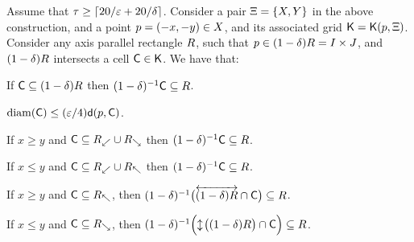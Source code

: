\documentclass[12pt]{article}%
\begin{document}
\begin{lemma}
    Assume that $\tau \geq \left\lceil {20/\varepsilon+ 20/\delta} \right\rceil$.  Consider a
    pair $\Xi = \{X, Y \}$ in the above construction, and a
    point $p =(-x,-y) \in X$, and its associated grid
    $\mathsf{K} = \mathsf{K}(p, \Xi)$. Consider any axis parallel rectangle
    $R$, such that $p \in (1-\delta)R = I\times J$, and
    $(1-\delta)R$ intersects a cell $\mathsf{C} \in \mathsf{K}$. We have
    that:
    \begin{compactenumI}
        \smallskip%
        \item {} If $\mathsf{C} \subseteq (1-\delta)R$ then
        $(1-\delta)^{-1} \mathsf{C} \subseteq R$.

        \item {}
        $\diameterX{\cell} \leq (\eps/4) \dsY{\pa}{\cell}$.

        \item {} If $x \geq y$ and
        $\mathsf{C} \subseteq R_\swarrow \cup R_\searrow$ then
        $(1-\delta)^{-1} \mathsf{C} \subseteq R$.

        \item {} If $x \leq y$ and
        $\mathsf{C} \subseteq R_\swarrow \cup R_\nwarrow$ then
        $(1-\delta)^{-1} \mathsf{C} \subseteq R$.

        \smallskip%
        \item {} If $x \geq y$ and
        $\mathsf{C} \subseteq R_\nwarrow$, then
        $(1-\delta)^{-1} \bigl(\overleftrightarrow{ (1-\delta)R} \cap \mathsf{C}
        \bigr) \subseteq R$.

        \smallskip%
        \item {} If $x \leq y$ and
        $\mathsf{C} \subseteq R_\searrow$, then
        $(1-\delta)^{-1} \Bigl(\updownarrow\!{\bigl( (1-\delta)R \bigr)}
        \cap \mathsf{C} \Bigr) \subseteq R$.
    \end{compactenumI}
\end{lemma}
\end{document}
